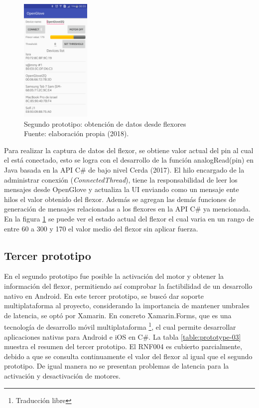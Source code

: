 \begin{figure}[H]
	\centering
	\captionsetup{justification=centering}
   	\includegraphics[width=0.3\textwidth]{images/chapter03/02-prototype.png} 
        \caption[Segundo prototipo: obtención de datos desde flexores]{Segundo prototipo: obtención de datos desde flexores \\ Fuente: elaboración propia (2018).}
    \label{fig:prototype-02}
\end{figure}

Para realizar la captura de datos del flexor, se obtiene valor actual del pin al cual el está conectado, esto se logra con el desarrollo de la función analogRead(pin) en Java basada en la API C\# de bajo nivel Cerda (2017). El hilo encargado de la administrar conexión (\textit{ConnectedThread}), tiene la responsabilidad de leer los mensajes desde OpenGlove y actualiza la UI enviando como un mensaje ente hilos el valor obtenido del flexor. Además se agregan las demás funciones de generación de mensajes relacionadas a los flexores en la API C\# ya mencionada. En la figura \ref{fig:prototype-02} se puede ver el estado actual del flexor el cual varia en un rango de entre 60 a 300 y 170 el valor medio del flexor sin aplicar fuerza.

\subsection{Tercer prototipo}
\label{tercer-prototipo}
En el segundo prototipo fue posible la activación del motor y obtener la información del flexor, permitiendo así comprobar la factibilidad de un desarrollo nativo en Android. En este tercer prototipo, se buscó dar soporte multiplataforma al proyecto, considerando la importancia de mantener umbrales de latencia, se optó por Xamarin. En concreto Xamarin.Forms,  que es una tecnología de desarrollo móvil multiplataforma \footnote{Traducción libre}, el cual permite desarrollar aplicaciones nativas para Android e iOS en C\#. La tabla \ref{table:prototype-03} muestra el resumen del tercer prototipo. El RNF004 es cubierto parcialmente, debido a que se consulta continuamente el valor del flexor al igual que el segundo prototipo. De igual manera no se presentan problemas de latencia para la activación y desactivación de motores.


